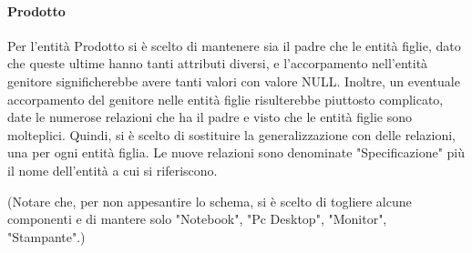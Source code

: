 \paragraph{Prodotto}
Per l'entità Prodotto si è scelto di mantenere sia il padre che le entità figlie, dato che queste ultime hanno tanti attributi diversi, e l'accorpamento nell'entità genitore significherebbe avere tanti valori con valore NULL. Inoltre, un eventuale accorpamento del genitore nelle entità figlie risulterebbe piuttosto complicato, date le numerose relazioni che ha il padre e visto che le entità figlie sono molteplici.
Quindi, si è scelto di sostituire la generalizzazione con delle relazioni, una per ogni entità figlia. Le nuove relazioni sono denominate "Specificazione" più il nome dell'entità a cui si riferiscono.

(Notare che, per non appesantire lo schema, si è scelto di togliere alcune componenti e di mantere solo "Notebook", "Pc Desktop", "Monitor", "Stampante".)




%
%
%
% 
%



%
%
%
